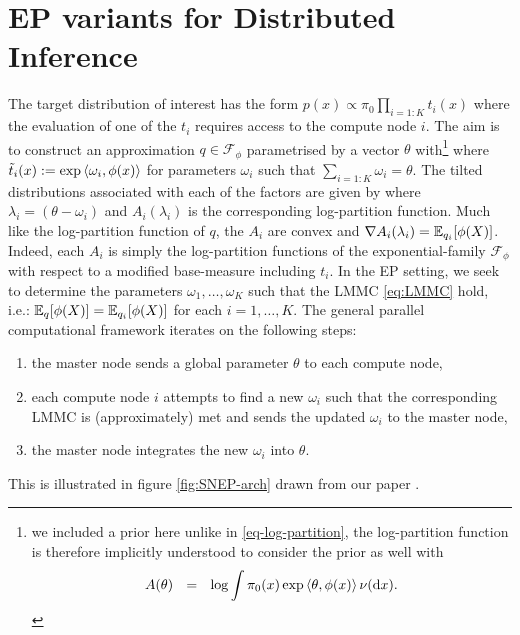 \section{\label{sec:ep-for-dbi}EP variants for Distributed Inference}
The target distribution of interest has the form $p(x)\propto \pi_0\prod_{i=1:K}t_i(x)$ where the evaluation of one of the $t_i$ requires access to the compute node $i$. The aim is to construct an approximation $q\in\mathcal F_\phi$ parametrised by a vector $\theta$ with\footnote{we included a prior here unlike in \eqref{eq-log-partition}, the log-partition function is therefore implicitly understood to consider the prior as well with
$$
	A(\theta) \quad\!\!=\quad\!\! \log \int \pi_{0}(x)\exp\left\langle \theta,\phi(x) \right\rangle\nu(\!\,\mathrm{d} x)
.
$$}
%
%
where $\tilde t_i(x):=\exp\left\langle \omega_i,\phi(x) \right\rangle$ for parameters $\omega_{i}$ such that $\sum_{i=1:K}\omega_i=\theta$. The tilted distributions associated with each of the factors are given by
%
% 
where $\lambda_i=(\theta-\omega_i)$ and $A_i(\lambda_i)$ is the corresponding log-partition function. Much like the log-partition function of $q$, the $A_i$ are convex and $\nabla A_i(\lambda_i)=\mathbb E_{q_i}[\phi(X)]$. Indeed, each $A_i$ is simply the log-partition functions of the exponential-family $\mathcal F_\phi$ with respect to a modified base-measure including $t_i$.
In the EP setting, we seek to determine the parameters $\omega_1,\dots,\omega_K$ such that the LMMC \eqref{eq:LMMC} hold, i.e.: $\mathbb E_q[\phi(X)]=\mathbb E_{q_i}[\phi(X)]$ for each $i=1,\dots,K$.
The general parallel computational framework iterates on the following steps:
\begin{enumerate}\itsepa
	\item the master node sends a global parameter $\theta$ to each compute node,
	\item each compute node $i$ attempts to find a new $\omega_i$ such that the corresponding LMMC is (approximately) met and sends the updated $\omega_i$ to the master node,
	\item the master node integrates the new $\omega_i$ into $\theta$.
\end{enumerate} 

\noindent This is illustrated in figure \ref{fig:SNEP-arch} drawn from our paper \citep{hasenclever16}.

